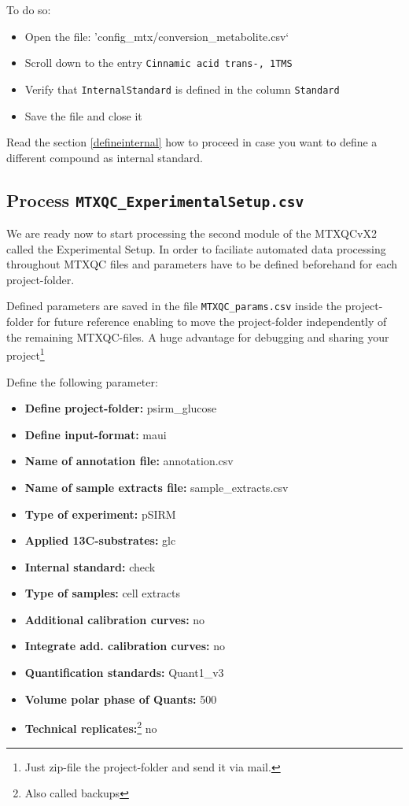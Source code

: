 \documentclass[]{book}
\providecommand{\tightlist}{%
  \setlength{\itemsep}{0pt}\setlength{\parskip}{0pt}}
\let\rmarkdownfootnote\footnote%
\def\footnote{\protect\rmarkdownfootnote}
\begin{document}
To do so:

\begin{itemize}
\tightlist
\item
  Open the file: 'config\_mtx/conversion\_metabolite.csv`
\item
  Scroll down to the entry \texttt{Cinnamic\ acid\ trans-,\ 1TMS}
\item
  Verify that \texttt{InternalStandard} is defined in the column \texttt{Standard}
\item
  Save the file and close it
\end{itemize}

Read the section \ref{defineinternal} how to proceed in case you want to define a different compound as internal standard.

\hypertarget{process-mtxqc_experimentalsetup.csv}{%
\subsection{\texorpdfstring{Process \texttt{MTXQC\_ExperimentalSetup.csv}}{Process MTXQC\_ExperimentalSetup.csv}}\label{process-mtxqc_experimentalsetup.csv}}

We are ready now to start processing the second module of the MTXQCvX2 called the Experimental Setup.
In order to faciliate automated data processing throughout MTXQC files and parameters have to be defined beforehand for each project-folder.

Defined parameters are saved in the file \texttt{MTXQC\_params.csv} inside the project-folder for future reference enabling to move the project-folder independently of the remaining MTXQC-files. A huge advantage for debugging and sharing your project\footnote{Just zip-file the project-folder and send it via mail.}

Define the following parameter:

\begin{itemize}
\tightlist
\item
  \textbf{Define project-folder:} psirm\_glucose
\item
  \textbf{Define input-format:} maui
\item
  \textbf{Name of annotation file:} annotation.csv
\item
  \textbf{Name of sample extracts file:} sample\_extracts.csv
\item
  \textbf{Type of experiment:} pSIRM
\item
  \textbf{Applied 13C-substrates:} glc
\item
  \textbf{Internal standard:} check
\item
  \textbf{Type of samples:} cell extracts
\item
  \textbf{Additional calibration curves:} no
\item
  \textbf{Integrate add. calibration curves:} no
\item
  \textbf{Quantification standards:} Quant1\_v3
\item
  \textbf{Volume polar phase of Quants:} 500
\item
  \textbf{Technical replicates:}\footnote{Also called backups} no
\end{itemize}
\end{document}
